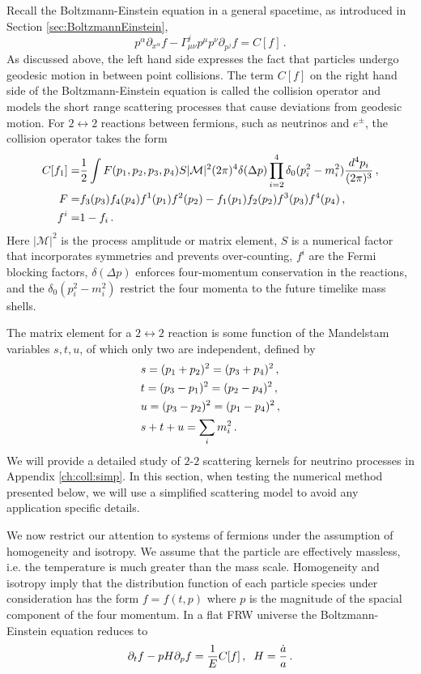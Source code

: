 Recall the  Boltzmann-Einstein equation in a general spacetime, as introduced in Section \ref{sec:BoltzmannEinstein},
\begin{equation}
p^\alpha\partial_{x^\alpha}f-\Gamma^j_{\mu\nu}p^\mu p^\nu\partial_{p^j}f=C[f]\,.
\end{equation}
As discussed above, the left hand side expresses the fact that particles undergo geodesic motion in between point collisions. The term $C[f]$ on the right hand side of the Boltzmann-Einstein equation is called the collision operator and models the short range scattering processes that cause deviations from geodesic motion. For $2\leftrightarrow 2$ reactions between fermions, such as neutrinos and $e^\pm$, the collision operator takes the form
\begin{align}\label{coll}
C[f_1]=&\frac{1}{2}\int F(p_1,p_2,p_3,p_4) S |\mathcal{M}|^2(2\pi)^4\delta(\Delta p)\prod_{i=2}^4\delta_0(p_i^2-m_i^2)\frac{d^4p_i}{(2\pi)^3}\,,\\
F=&f_3(p_3)f_4(p_4)f^1(p_1)f^2(p_2)-f_1(p_1)f_2(p_2)f^3(p_3)f^4(p_4)\,,\notag\\
f^i=&1- f_i\,.\notag
\end{align}
Here $|\mathcal{M}|^2$ is the process amplitude or matrix element, $S$ is a numerical factor that incorporates symmetries and prevents over-counting, $f^i$ are the Fermi blocking factors, $\delta(\Delta p)$ enforces four-momentum conservation in the reactions, and the $\delta_0(p_i^2-m_i^2)$ restrict the four momenta to the future timelike mass shells.


The matrix element for a $2\leftrightarrow2$ reaction is some function of the Mandelstam variables $s, t, u$, of which only two are independent, defined by
\begin{align}\label{Mandelstam}
&s=(p_1+p_2)^2=(p_3+p_4)^2\,,\\
&t=(p_3-p_1)^2=(p_2-p_4)^2\,,\notag\\
&u=(p_3-p_2)^2=(p_1-p_4)^2\,,\notag\\
&s+t+u=\sum_i m_i^2\,.\notag
\end{align}
We will provide a detailed study of $2$-$2$ scattering kernels for neutrino processes in Appendix \ref{ch:coll:simp}.  In this section, when testing the numerical method presented below, we will use a simplified scattering model to avoid any application specific details.

We now restrict our attention to  systems of fermions under the assumption of homogeneity and isotropy. We assume that the particle are effectively massless,  i.e. the temperature is much greater than the mass scale.  Homogeneity and isotropy imply that the distribution function of each particle species under consideration has the form $f=f(t,p)$ where $p$ is the magnitude of the spacial component of the four momentum.  In a flat FRW universe the Boltzmann-Einstein equation reduces to
\begin{equation}\label{boltzmann:p}
\partial_t f-pH \partial_p f=\frac{1}{E}C[f]\,,\hspace{2mm} H=\frac{\dot{a}}{a}\,.
\end{equation}

